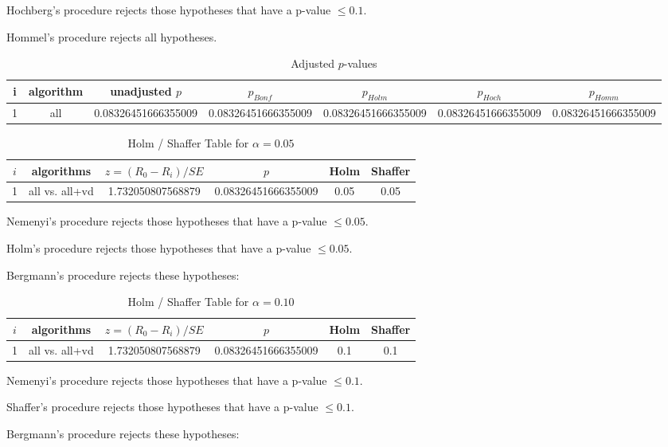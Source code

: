\documentclass[a4paper,10pt]{article}
\begin{document}
\begin{landscape}
Hochberg's procedure rejects those hypotheses that have a p-value $\le0.1$.


Hommel's procedure rejects all hypotheses.


\begin{table}[!htp]
\centering\tiny
\caption{Adjusted $p$-values}
\begin{tabular}{ccccccc}
i&algorithm&unadjusted $p$&$p_{Bonf}$&$p_{Holm}$&$p_{Hoch}$&$p_{Homm}$\\
\hline
1&all&0.08326451666355009&0.08326451666355009&0.08326451666355009&0.08326451666355009&0.08326451666355009\\
\hline
\end{tabular}
\end{table}

\begin{table}[!htp]
\centering\tiny
\caption{Holm / Shaffer Table for $\alpha=0.05$}
\begin{tabular}{cccccc}
$i$&algorithms&$z=(R_0 - R_i)/SE$&$p$&Holm&Shaffer\\
\hline
1&all vs. all+vd&1.732050807568879&0.08326451666355009&0.05&0.05\\\hline
\end{tabular}
\end{table}
Nemenyi's procedure rejects those hypotheses that have a p-value $\le0.05$.


Holm's procedure rejects those hypotheses that have a p-value $\le0.05$.


Bergmann's procedure rejects these hypotheses:


\begin{itemize}


\end{itemize}


\begin{table}[!htp]
\centering\tiny
\caption{Holm / Shaffer Table for $\alpha=0.10$}
\begin{tabular}{cccccc}
$i$&algorithms&$z=(R_0 - R_i)/SE$&$p$&Holm&Shaffer\\
\hline
1&all vs. all+vd&1.732050807568879&0.08326451666355009&0.1&0.1\\\hline
\end{tabular}
\end{table}
Nemenyi's procedure rejects those hypotheses that have a p-value $\le0.1$.


Shaffer's procedure rejects those hypotheses that have a p-value $\le0.1$.


Bergmann's procedure rejects these hypotheses:



\end{landscape}
\end{document}

